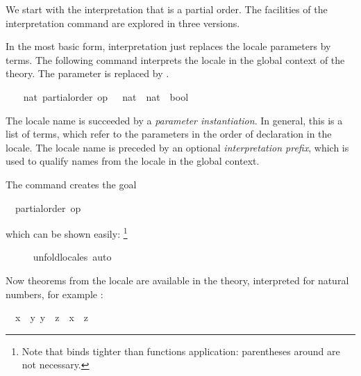 \begin{isabellebody}
\begin{isamarkuptext}
  We start with the
  interpretation that \isa{{\isasymle}} is a partial order.  The facilities of
  the interpretation command are explored in three versions.%
\end{isamarkuptext}%
\isamarkuptrue%
%
\isamarkuptrue%
%
\begin{isamarkuptext}%
In the most basic form, interpretation just replaces the locale
  parameters by terms.  The following command interprets the locale
   in the global context of the theory.  The
  parameter  is replaced by .%
\end{isamarkuptext}%
\isamarkuptrue%
%
\isadelimvisible
\ \ %
\endisadelimvisible
%
\isatagvisible
{}\isamarkupfalse%
\ nat{\isacharcolon}\ partial{\isacharunderscore}order\ {\isacharbrackleft}{\isachardoublequoteopen}op\ {\isasymle}\ {\isacharcolon}{\isacharcolon}\ nat\ {\isasymRightarrow}\ nat\ {\isasymRightarrow}\ bool{\isachardoublequoteclose}{\isacharbrackright}%
\begin{isamarkuptxt}%
The locale name is succeeded by a \emph{parameter
  instantiation}.  In general, this is a list of terms, which refer to
  the parameters in the order of declaration in the locale.  The
  locale name is preceded by an optional \emph{interpretation prefix},
  which is used to qualify names from the locale in the global
  context.

  The command creates the goal \begin{isabelle}%
\ {}{\isachardot}\ partial{\isacharunderscore}order\ op\ {\isasymle}%
\end{isabelle} which can be shown
  easily:%
\footnote{Note that  binds tighter than functions
  application: parentheses around  are not necessary.}%
\end{isamarkuptxt}%
\isamarkuptrue%
\ \ \ \ \isamarkupfalse%
\ unfold{\isacharunderscore}locales\ auto%
\endisatagvisible
{\isafoldvisible}%
%
\isadelimvisible
%
\endisadelimvisible
%
\begin{isamarkuptext}%
Now theorems from the locale are available in the theory,
  interpreted for natural numbers, for example : \begin{isabelle}%
\ \ {\isasymlbrakk}{\isacharquery}x\ {\isasymle}\ {\isacharquery}y{\isacharsemicolon}\ {\isacharquery}y\ {\isasymle}\ {\isacharquery}z{\isasymrbrakk}\ {\isasymLongrightarrow}\ {\isacharquery}x\ {\isasymle}\ {\isacharquery}z%
\end{isabelle}


\end{isamarkuptext}
\end{isabellebody}
